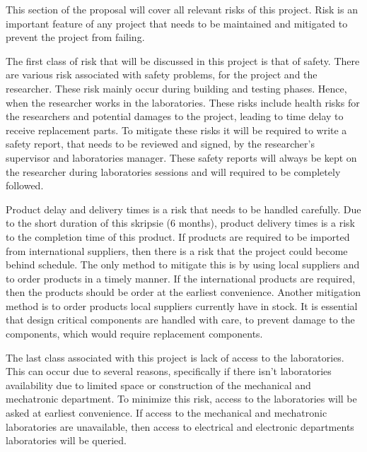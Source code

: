 This section of the proposal will cover all relevant risks of this project. Risk is an important feature of any project that needs to be maintained and mitigated to prevent the project from failing. 

\vspace{0.5cm}
\noindent
The first class of risk that will be discussed in this project is that of safety. There are various risk associated with safety problems, for the project and the researcher. These risk mainly occur during building and testing phases. Hence, when the researcher works in the laboratories. These risks include health risks for the researchers and potential damages to the project, leading to time delay to receive replacement parts. To mitigate these risks it will be required to write a safety report, that needs to be reviewed and signed, by the researcher's supervisor and laboratories manager. These safety reports will always be kept on the researcher during laboratories sessions and will required to be completely followed.

\vspace{0.5cm}
\noindent
Product delay and delivery times is a risk that needs to be handled carefully. Due to the short duration of this skripsie (6 months), product delivery times is a risk to the completion time of this product. If products are required to be imported from international suppliers, then there is a risk that the project could become behind schedule. The only method to mitigate this is by using local suppliers and to order products in a timely manner. If the international products are required, then the products should be order at the earliest convenience.  Another mitigation method is to order products local suppliers currently have in stock. It is essential that design critical components are handled with care, to prevent damage to the components, which would require replacement components.

\vspace{0.5cm}
\noindent
The last class associated with this project is lack of access to the laboratories. This can occur due to several reasons, specifically if there isn't laboratories availability due to limited space or construction of the mechanical and mechatronic department. To minimize this risk, access to the laboratories will be asked at earliest convenience. If access to the mechanical and mechatronic laboratories are unavailable, then access to electrical and electronic departments laboratories will be queried.


